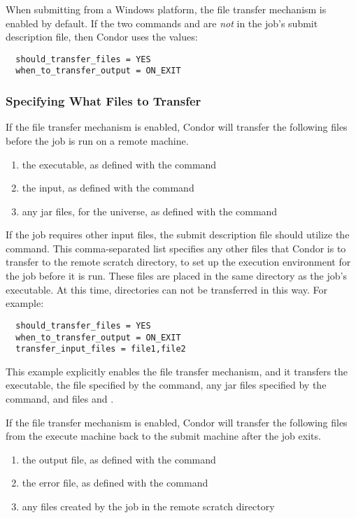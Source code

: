 When submitting from a Windows platform,
the file transfer mechanism is enabled by default.
If the two commands  and
 are \emph{not} in the job's
submit description file, then Condor uses the values:

\begin{verbatim}
  should_transfer_files = YES
  when_to_transfer_output = ON_EXIT
\end{verbatim}


\subsubsection{Specifying What Files to Transfer}

If the file transfer mechanism is enabled,
Condor will transfer the following files before the job
is run on a remote machine.
\begin{enumerate}
  \item the executable, as defined with the  command
  \item the input, as defined with the  command
  \item any jar files, for the  universe,
  as defined with the  command
\end{enumerate}
If the job requires other input files,
the submit description file should utilize the
 command.
This comma-separated list specifies any other files that Condor is to
transfer to the remote scratch directory,
to set up the execution environment for the job before it is run.
These files are placed in the same directory as the job's executable.
At this time, directories can not be transferred in this way.
For example:

\begin{verbatim}
  should_transfer_files = YES
  when_to_transfer_output = ON_EXIT
  transfer_input_files = file1,file2 
\end{verbatim}
This example explicitly enables the file transfer mechanism,
and it transfers the executable, the file specified by the 
command, any jar files specified by the  command,
and files  and .

If the file transfer mechanism is enabled,
Condor will transfer the following files from the execute machine
back to the submit machine after the job exits.
\begin{enumerate}
  \item the output file, as defined with the  command
  \item the error file, as defined with the  command
  \item any files created by the job in the remote scratch directory
\end{enumerate}

